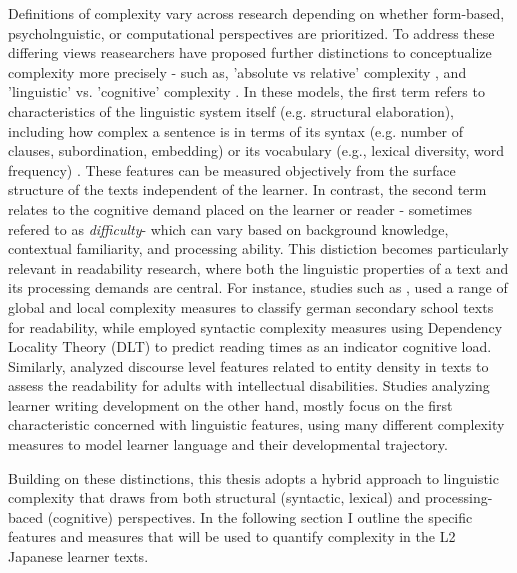 Definitions of complexity vary across research depending on whether form-based, psycholnguistic, or computational
perspectives are prioritized. To address these differing views reasearchers have proposed further distinctions
to conceptualize complexity more precisely - such as, 'absolute vs relative' complexity
\citet{Miestamo2008, Butle2012}, and
'linguistic' vs. 'cognitive' complexity \cite{housen2009}. In these models, the first term refers to characteristics
of the linguistic system itself (e.g. structural elaboration), including how complex a sentence is in terms of its
syntax (e.g. number of clauses, subordination, embedding) or its vocabulary (e.g., lexical diversity, word frequency)
. These features can be measured objectively from the surface structure of the texts independent of the learner. In
contrast,
the
second term relates
to the
cognitive demand placed on the learner or reader - sometimes refered to as \emph{difficulty}- which can vary based
on background knowledge, contextual familiarity, and processing ability. This distiction
becomes particularly relevant in readability research, where both the linguistic properties of a text and its
processing demands are central. For instance, studies such as \citet{Berendes2018}, used a range of global and local
complexity measures to classify german secondary school texts for readability, while
\citet{shain2016}
employed syntactic
complexity
measures using Dependency Locality Theory (DLT) to predict reading times as an indicator cognitive load. Similarly, \citet{Feng2009} analyzed discourse level features related to entity density in texts to assess the readability for adults with intellectual disabilities. Studies analyzing learner writing development on the other hand, mostly focus on the first characteristic concerned with linguistic features, using many different complexity measures to model learner language and their developmental trajectory\cite{Lu2010,Lu2011,Vyatkina2012,weiss2019,Iwashita2006,Wolfe1998, Ortega2003,NorrisOrtega2009}.

Building on these distinctions, this thesis adopts a hybrid approach to linguistic complexity that draws from both
structural (syntactic, lexical) and processing-baced (cognitive) perspectives. In the following section I outline
the specific features and measures that will be used to quantify complexity in the L2 Japanese learner texts.


